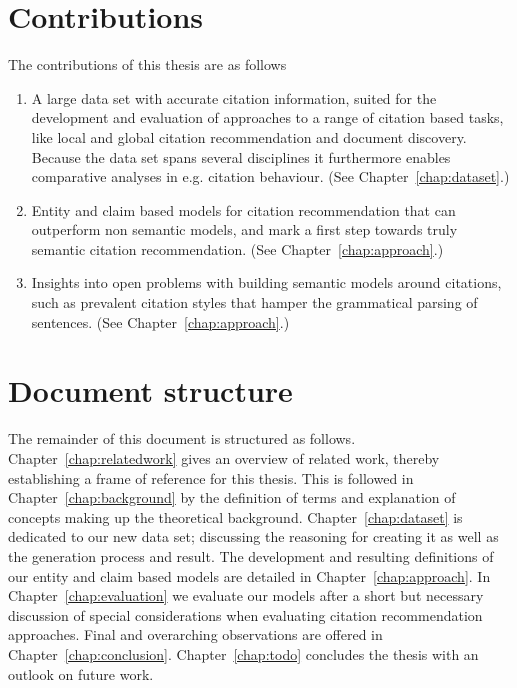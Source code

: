 \section{Contributions}\label{sec:contributions}
The contributions of this thesis are as follows
\begin{enumerate}
\item A large data set with accurate citation information, suited for the development and evaluation of approaches to a range of citation based tasks, like local and global citation recommendation and document discovery. Because the data set spans several disciplines it furthermore enables comparative analyses in e.g. citation behaviour. (See Chapter~\ref{chap:dataset}.)
\item Entity and claim based models for citation recommendation that can outperform non semantic models, and mark a first step towards truly semantic citation recommendation. (See Chapter~\ref{chap:approach}.)
\item Insights into open problems with building semantic models around citations, such as prevalent citation styles that hamper the grammatical parsing of sentences. (See Chapter~\ref{chap:approach}.)
\end{enumerate}

\section{Document structure}\label{sec:documentstructure}
The remainder of this document is structured as follows. Chapter~\ref{chap:relatedwork} gives an overview of related work, thereby establishing a frame of reference for this thesis. This is followed in Chapter~\ref{chap:background} by the definition of terms and explanation of concepts making up the theoretical background. Chapter~\ref{chap:dataset} is dedicated to our new data set; discussing the reasoning for creating it as well as the generation process and result. The development and resulting definitions of our entity and claim based models are detailed in Chapter~\ref{chap:approach}. In Chapter~\ref{chap:evaluation} we evaluate our models after a short but necessary discussion of special considerations when evaluating citation recommendation approaches. Final and overarching observations are offered in Chapter~\ref{chap:conclusion}. Chapter~\ref{chap:todo} concludes the thesis with an outlook on future work.
